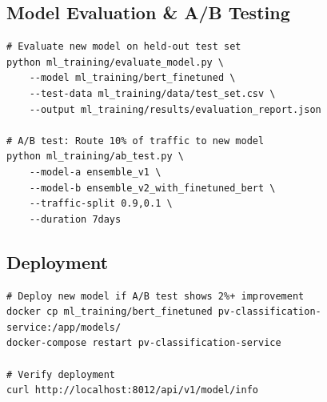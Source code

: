 \subsection{Model Evaluation \& A/B Testing}

\begin{lstlisting}[style=pythonstyle]
# Evaluate new model on held-out test set
python ml_training/evaluate_model.py \
    --model ml_training/bert_finetuned \
    --test-data ml_training/data/test_set.csv \
    --output ml_training/results/evaluation_report.json

# A/B test: Route 10% of traffic to new model
python ml_training/ab_test.py \
    --model-a ensemble_v1 \
    --model-b ensemble_v2_with_finetuned_bert \
    --traffic-split 0.9,0.1 \
    --duration 7days
\end{lstlisting}

\subsection{Deployment}

\begin{commandbox}
\begin{lstlisting}[style=bashstyle]
# Deploy new model if A/B test shows 2%+ improvement
docker cp ml_training/bert_finetuned pv-classification-service:/app/models/
docker-compose restart pv-classification-service

# Verify deployment
curl http://localhost:8012/api/v1/model/info
\end{lstlisting}
\end{commandbox}




